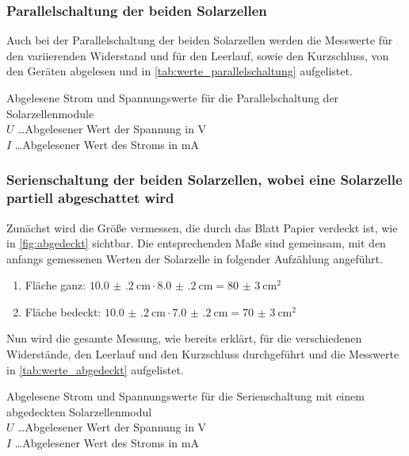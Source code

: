 \documentclass[12pt,english,ngerman]{scrartcl}
\begin{document}
\subsubsection{Parallelschaltung der beiden Solarzellen}
Auch bei der Parallelschaltung der beiden Solarzellen werden die Messwerte für
den variierenden Widerstand und für den Leerlauf, sowie den Kurzschluss, von
den Geräten abgelesen und in \autoref{tab:werte_parallelschaltung} aufgelistet.

\begin{table}[H]
	\caption[Abgelesene Strom und Spannungswerte für die Parallelschaltung der
		Solarzellenmodule] {Abgelesene Strom und Spannungswerte für die
		Parallelschaltung der Solarzellenmodule      \\
		$U$ \dots Abgelesener Wert der Spannung in V \\
		$I$ \dots Abgelesener Wert des Stroms in mA
	}\label{tab:werte_parallelschaltung}
	\centering
	
\end{table}

\subsubsection{Serienschaltung der beiden Solarzellen, wobei eine Solarzelle partiell abgeschattet wird}\label{list:flaechenSolar1}
Zunächst wird die Größe vermessen, die durch das Blatt Papier verdeckt ist, wie
in \autoref{fig:abgedeckt} sichtbar. Die entsprechenden Maße sind gemeinsam,
mit den anfangs gemessenen Werten der Solarzelle in folgender Aufzählung
angeführt.

\begin{enumerate}
	\item Fläche ganz: $\SI{10.0(2)}{\cm}\cdot \SI{8.0(2)}{\cm}=\SI{80(3)}{\cm\squared}$
	\item Fläche bedeckt: $\SI{10.0(2)}{\cm}\cdot
		      \SI{7.0(2)}{\cm}=\SI{70(3)}{\cm\squared}$
\end{enumerate}

Nun wird die gesamte Messung, wie bereits erklärt, für die verschiedenen
Widerstände, den Leerlauf und den Kurzschluss durchgeführt und die Messwerte in
\autoref{tab:werte_abgedeckt} aufgelistet.

\begin{table}[H]
	\caption[Abgelesene Strom und Spannungswerte für die Serienschaltung mit einem
		abgedeckten Solarzellenmodul] {Abgelesene Strom und Spannungswerte für die
		Serienschaltung mit einem abgedeckten Solarzellenmodul \\
		$U$ \dots Abgelesener Wert der Spannung in V           \\
		$I$ \dots Abgelesener Wert des Stroms in mA
	}\label{tab:werte_abgedeckt}
	\centering
	
\end{table}
\end{document}
